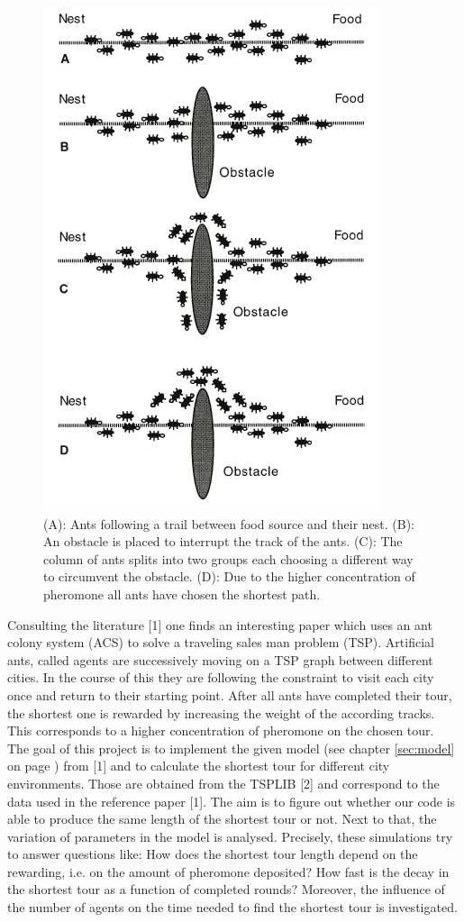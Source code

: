 \begin{figure}
\includegraphics[width=0.4\linewidth]{ants}
\caption{(A): Ants following a trail between food source and their nest. (B): An obstacle is placed to interrupt the track of the ants. (C): The column of ants splits into two groups each choosing a different way to circumvent the obstacle. (D): Due to the higher concentration of pheromone all ants have chosen the shortest path.}
\label{fig:ants}
\end{figure}
\noindent Consulting the literature [1] one finds an interesting paper which uses an ant colony system (ACS) to solve a traveling sales man problem (TSP). Artificial ants, called agents are successively moving on a TSP graph between different cities. In the course of this they are following the constraint to visit each city once and return to their starting point. After all ants have completed their tour, the shortest one is rewarded by increasing the weight of the according tracks. This corresponds to a higher concentration of pheromone on the chosen tour.\\
The goal of this project is to implement the given model (see chapter \ref{sec:model} on page \pageref{sec:model}) from [1] and to calculate the shortest tour for different city environments. Those are obtained from the TSPLIB [2] and correspond to the data used in the reference paper [1]. The aim is to figure out whether our code is able to produce the same length of the shortest tour or not. Next to that, the variation of parameters in the model is analysed. Precisely, these simulations try to answer questions like: How does the shortest tour length depend on the rewarding, i.e. on the amount of pheromone deposited? How fast is the decay in the shortest tour as a function of completed rounds? Moreover, the influence of the number of agents on the time needed to find the shortest tour is investigated.